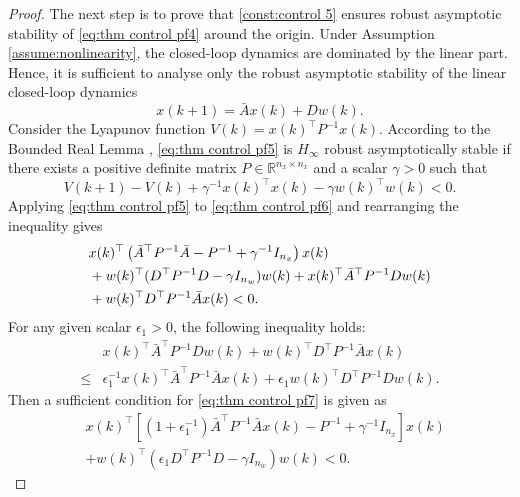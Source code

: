 \documentclass[letterpaper, 10 pt, conference]{ieeeconf}
\begin{document}
\begin{proof}
		The next step is to prove that \eqref{const:control 5} ensures robust 
		asymptotic stability of \eqref{eq:thm control pf4} around the origin. Under 
		Assumption \ref{assume:nonlinearity}, the closed-loop dynamics are dominated by 
		the linear part. Hence, it is sufficient to analyse only the robust asymptotic stability 
		of the linear closed-loop dynamics
		\begin{equation}\label{eq:thm control pf5}
			x(k+1) = \bar{A} x(k) + D w(k).
		\end{equation}
		Consider the Lyapunov function $V(k) = x(k)^\top P^{-1} x(k)$. According to the Bounded Real Lemma \cite{SchererWeiland00}, \eqref{eq:thm control pf5} is $H_\infty$ robust asymptotically 
		stable if there exists a positive definite matrix 
		$P \in \mathbb{R}^{n_x \times n_x}$ and a scalar $\gamma > 0$ such that
		\begin{equation}\label{eq:thm control pf6}
			V(k+1) - V(k) + \gamma^{-1} x(k)^\top x(k) - \gamma w(k)^\top w(k) < 0.
		\end{equation}
		Applying \eqref{eq:thm control pf5} to \eqref{eq:thm control pf6} and rearranging the inequality gives
		\begin{align}\label{eq:thm control pf7}	
			\setlength{\parindent}{0in}	
			&x(k)^\top \left( \bar{A}^\top P^{-1}  \bar{A} - P^{-1} + \gamma^{-1} I_{n_x} \right) x(k) 
			\nonumber\\
			& + w(k)^\top (D^\top P^{-1} D - \gamma I_{n_w}) w(k) + x(k)^\top \bar{A}^\top 
			P^{-1} D w(k) \nonumber\\
			&  + w(k)^\top D^\top P^{-1} \bar{A} x(k) 
			< 0.
		\end{align}
		For any given scalar $\epsilon_1 > 0$, the following inequality holds:
		\begin{align}
			& x(k)^\top \bar{A}^\top P^{-1} D w(k) + w(k)^\top D^\top P^{-1} \bar{A} x(k) 
			\nonumber\\
			\leq{}& \epsilon_1^{-1} x(k)^\top \bar{A}^\top P^{-1}  \bar{A} x(k) + \epsilon_1 w(k)^\top D^\top P^{-1} D 
			w(k). \nonumber	
		\end{align}
		Then  
		a sufficient condition for \eqref{eq:thm control pf7} is given as
		\begin{align}\label{eq:thm control pf8}
			&x(k)^\top \left[ (1+\epsilon_1^{-1}) \bar{A}^\top P^{-1}  \bar{A} x(k) - P^{-1}  + \gamma^{-1} 
			I_{n_x} \right] x(k) \nonumber\\
			&+ w(k)^\top ( \epsilon_1 D^\top P^{-1} D - \gamma I_{n_w}) w(k) < 0.
		\end{align}
		

\end{proof}
\end{document}
